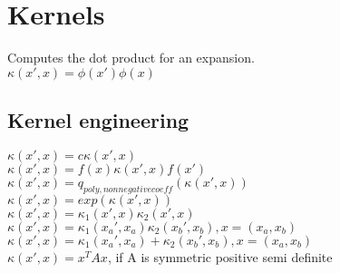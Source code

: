 \section{Kernels}
Computes the dot product for an expansion.\\ $\kappa(x', x) = \phi(x') \phi(x)$\\
\subsection{Kernel
engineering}
$\kappa(x', x) = c\kappa(x', x)$\\ $\kappa(x', x) = f(x)\kappa(x', x)f(x')$\\ $\kappa
(x', x) =q_{poly, non negative coeff}(\kappa(x', x))$\\
$\kappa(x', x) = exp(\kappa(x', x))$\\ $\kappa(x', x) =\kappa_{1}(x', x)\kappa_{2}
(x', x)$\\
$\kappa(x', x) =\kappa_{1}(x_{a}', x_{a})\kappa_{2}(x_{b}', x_{b}), x = (x_{a}, x
_{b})$\\ $\kappa(x', x) =\kappa_{1}(x_{a}', x_{a})+\kappa_{2}(x_{b}', x_{b}), x =
(x_{a}, x_{b})$\\ $\kappa(x', x) =x^{T}Ax$, if A is symmetric positive semi definite\\